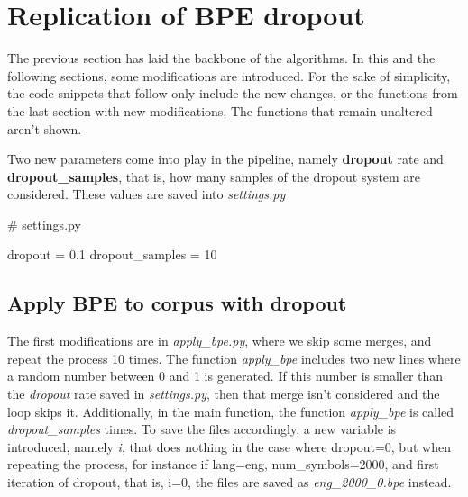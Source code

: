 \section{Replication of BPE dropout}

The previous section has laid the backbone of the algorithms. In this and the following sections, some modifications are introduced. For the sake of simplicity, the code snippets that follow only include the new changes, or the functions from the last section with new modifications. The functions that remain unaltered aren't shown.

Two new parameters come into play in the pipeline, namely \textbf{dropout} rate and \textbf{dropout\_samples}, that is, how many samples of the dropout system are considered. These values are saved into \emph{settings.py}

\begin{python}
# settings.py

dropout = 0.1
dropout_samples = 10
\end{python}

\subsection{Apply BPE to corpus with dropout}

The first modifications are in \emph{apply\_bpe.py}, where we skip some merges, and repeat the process 10 times. The function \emph{apply\_bpe} includes two new lines where a random number between 0 and 1 is generated. If this number is smaller than the \emph{dropout} rate saved in \emph{settings.py}, then that merge isn't considered and the loop skips it. Additionally, in the main function, the function \emph{apply\_bpe} is called \emph{dropout\_samples} times. To save the files accordingly, a new variable is introduced, namely \emph{i}, that does nothing in the case where dropout=0, but when repeating the process, for instance if lang=eng, num\_symbols=2000, and first iteration of dropout, that is, i=0, the files are saved as \emph{eng\_2000\_0.bpe} instead.


